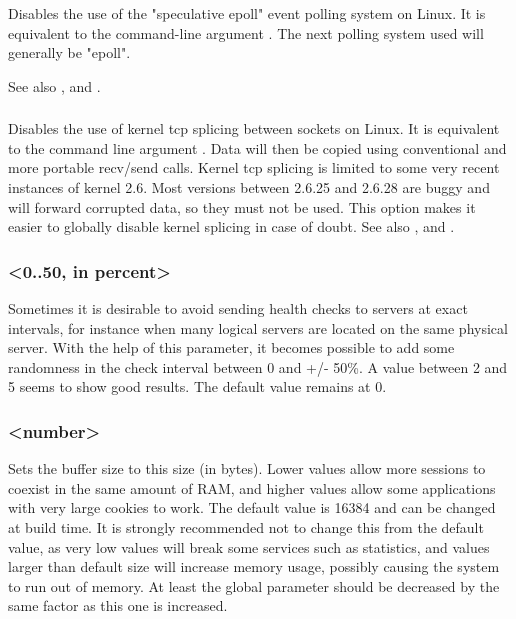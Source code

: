 Disables the use of the "speculative epoll" event polling system on Linux. It
is equivalent to the command-line argument . The next polling system
used will generally be "epoll".

See also , and .

\subsubsection[nosplice]{}

Disables the use of kernel tcp splicing between sockets on Linux. It is
equivalent to the command line argument .  Data will then be copied
using conventional and more portable recv/send calls. Kernel tcp splicing is
limited to some very recent instances of kernel 2.6. Most versions between
2.6.25 and 2.6.28 are buggy and will forward corrupted data, so they must not
be used. This option makes it easier to globally disable kernel splicing in
case of doubt. See also ,  and
.

\subsubsection[spread-checks]{ <0..50, in percent>}

Sometimes it is desirable to avoid sending health checks to servers at exact
intervals, for instance when many logical servers are located on the same
physical server. With the help of this parameter, it becomes possible to add
some randomness in the check interval between 0 and +/- 50\%. A value between
2 and 5 seems to show good results. The default value remains at 0.

\subsubsection[tune.bufsize]{ <number>}

Sets the buffer size to this size (in bytes). Lower values allow more
sessions to coexist in the same amount of RAM, and higher values allow some
applications with very large cookies to work. The default value is 16384 and
can be changed at build time. It is strongly recommended not to change this
from the default value, as very low values will break some services such as
statistics, and values larger than default size will increase memory usage,
possibly causing the system to run out of memory. At least the global 
parameter should be decreased by the same factor as this one is increased.

